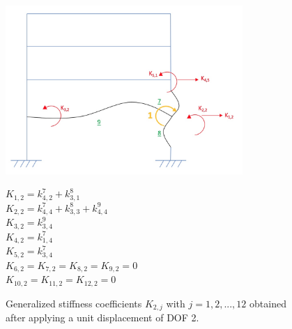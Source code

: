 \documentclass[11pt,a4paper,titlepage]{report}
\begin{document}
\begin{figure} [h]
\begin{minipage}{0.59\linewidth}
        \centering
         \includegraphics[width=9cm]{U=2.jpeg}
\end{minipage}
\begin{minipage}{0.4\linewidth}
\begin{small}
            $K_{1,2} = k^7_{4,2}+k^8_{3,1}$\\
            $K_{2,2} = k^7_{4,4}+k^8_{3,3}+k^9_{4,4}$\\
            $K_{3,2} = k^9_{3,4}$\\
            $K_{4,2} = k^7_{1,4}$\\
            $K_{5,2} = k^7_{3,4}$\\
            $K_{6,2} = K_{7,2} = K_{8,2} = K_{9,2} = 0$\\
            $K_{10,2} = K_{11,2} = K_{12,2} = 0$\\
\end{small}
\end{minipage}
\caption{Generalized stiffness coefficients $K_{2,j}$ with $j=1,2,...,12$ obtained after applying a unit displacement of DOF 2.}
\label{fig: I.1 - u2=1}
\end{figure}
\newpage
\end{document}
